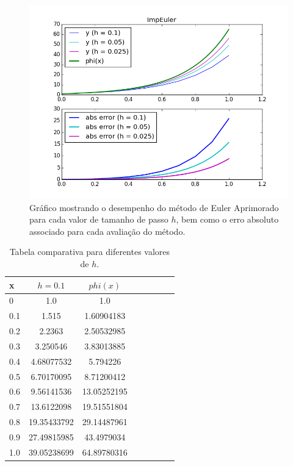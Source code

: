 \documentclass[a4paper]{article}
\begin{document}
\begin{figure}[!h]
\centering
\includegraphics[width=1.0\textwidth]{plots/ImpEuler.png}
\caption{\label{fig:impeuler}Gráfico mostrando o desempenho do método de Euler Aprimorado para cada valor de tamanho de passo $h$, bem como o erro absoluto associado para cada avaliação do método.}
\end{figure}

\begin{table}[!h]
\centering
\begin{tabular}{l*{6}{c}r}
x               & $h=0.1$ & $phi(x)$ \\
\hline
0                   & 1.0 & 1.0          \\
0.1                 & 1.515 & 1.60904183   \\
0.2                 & 2.2363 & 2.50532985   \\
0.3                 & 3.250546 & 3.83013885   \\
0.4                 & 4.68077532 & 5.794226     \\
0.5                 & 6.70170095 & 8.71200412   \\
0.6                 & 9.56141536 & 13.05252195  \\
0.7                 & 13.6122098 & 19.51551804  \\
0.8                 & 19.35433792 & 29.14487961  \\
0.9                 & 27.49815985 & 43.4979034   \\
1.0                 & 39.05238699 & 64.89780316  \\
\end{tabular}
\caption{\label{tab:impeuler}Tabela comparativa para diferentes valores de $h$.}
\end{table}
\end{document}
